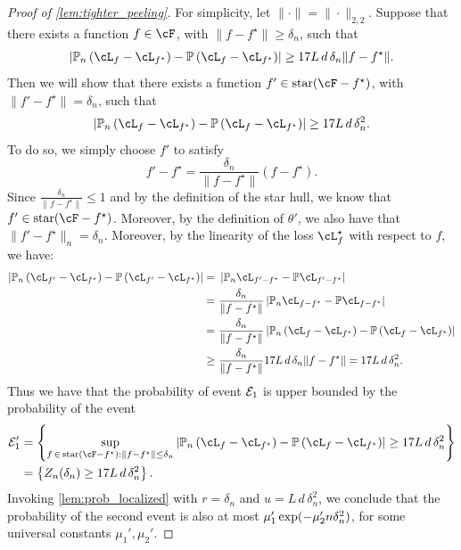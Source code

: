 \documentclass[11pt]{article} %
\newcommand{\pref}[1]{\cref{#1}}
\theoremstyle{theorem}  %
\theoremstyle{plain}
\DeclarePairedDelimiter{\prn}{(}{)}
\newcommand{\Pn}{\ensuremath{\mathbb{P}}}
\newcommand{\sh}{\ensuremath{\mathrm{star}}}
\begin{document}
\begin{proof}[Proof of \pref{lem:tighter_peeling}]
For simplicity, let $\|\cdot\|=\|\cdot\|_{2,2}$. Suppose that there
exists a function $f\in \cF$, with $\|f - f^{\star}\| \geq \delta_n$, such that
$$\left| \Pn_n \left(\cL_{f} - \cL_{f^{\star}}\right) - \Pn \left(\cL_{f} - \cL_{f^{\star}}\right)\right| \geq 17 L\,d\, \delta_n \|f - f^{\star}\|.$$
Then we will show that there exists a function $f'\in \sh(\cF - f^{\star})$, with $\|f' - f^{\star}\|=\delta_n$, such that
$$\left| \Pn_n \left(\cL_{f} - \cL_{f^{\star}}\right) - \Pn \left(\cL_{f} - \cL_{f^{\star}}\right)\right| \geq 17 L\,d\, \delta_n^2.$$
To do so, we simply choose $f'$ to satisfy
\begin{equation*}
f' - f^{\star} = \frac{\delta_n}{\|f - f^{\star}\|}\left(f-f^{\star}\right).
\end{equation*}
Since $\frac{\delta_n}{\|f-f^{\star}\|}\leq 1$ and by the definition
of the star hull, we know that $f'\in \sh(\cF - f^{\star})$. Moreover,
by the definition of $\theta'$, we also have that $\|f'-f^{\star}\|_n = \delta_n$. Moreover, by the linearity of the loss $\cL^{\star}_{f}$ with respect to $f$, we have:
\begin{align*}
\left| \Pn_n \left(\cL_{f'} - \cL_{f^{\star}}\right) - \Pn \left(\cL_{f'} - \cL_{f^{\star}}\right)\right| =~& \left| \Pn_n \cL_{f'-f^{\star}} - \Pn \cL_{f'-f^{\star}}\right|\\
=~& \frac{\delta_n}{\|f-f^{\star}\|}\left| \Pn_n \cL_{f-f^{\star}} - \Pn \cL_{f-f^{\star}}\right|\\
=~& \frac{\delta_n}{\|f-f^{\star}\|}\left| \Pn_n \left(\cL_{f} - \cL_{f^{\star}}\right) - \Pn \left(\cL_{f} - \cL_{f^{\star}}\right)\right|\\
\geq~& \frac{\delta_n}{\|f-f^{\star}\|} 17 L\,d\, \delta_n \|f-f^{\star}\| = 17 L\,d\, \delta_n^2.
\end{align*}
Thus we have that the probability of event ${\cal E}_1$ is upper bounded by the probability of the event
\begin{align*}
{\cal E}_1' &= \left\{\sup_{f\,\in\, \sh(\cF - f^{\star}): \|f - f^{\star}\|\leq \delta_n} \left| \Pn_n \left(\cL_{f} - \cL_{f^{\star}}\right) - \Pn \left(\cL_{f} - \cL_{f^{\star}}\right)\right| \geq 17 L\,d\, \delta_n^2\right\} \\&= \left\{Z_n(\delta_n) \geq 17 L\,d\, \delta_n^2\right\}.
\end{align*}
Invoking \pref{lem:prob_localized} with $r=\delta_n$ and $u=L\,d\,\delta_n^2$, we conclude that the probability of the second event is also at most $\mu_1' \exp\prn{-\mu_2' n \delta_n^2}$, for some universal constants $\mu_1',\mu_2'$. 
\end{proof}
\end{document}
